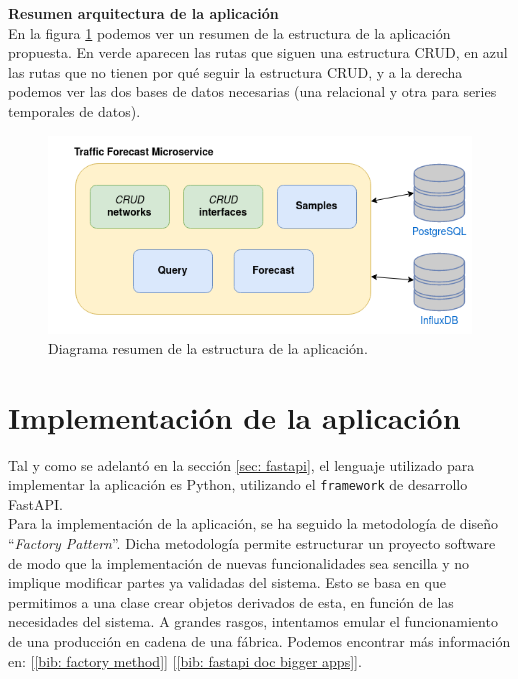 \documentclass[a4paper, oneside, 12pt]{book}
\begin{document}
	\noindent \textbf{\large Resumen arquitectura de la aplicación} \\
	
	\noindent En la figura \ref{img: app schema} podemos ver un resumen de la estructura de la aplicación propuesta. En verde aparecen las rutas que siguen una estructura CRUD, en azul las rutas que no tienen por qué seguir la estructura CRUD, y a la derecha podemos ver las dos bases de datos necesarias (una relacional y otra para series temporales de datos).
	
	\begin{figure}[h!]
		\includegraphics[width=1.1\textwidth, center]{diag/traffic_forecast_schema.png}
		\caption{Diagrama resumen de la estructura de la aplicación.}
		\label{img: app schema}
	\end{figure}

	\pagebreak
	
	\section{Implementación de la aplicación}
	
	\noindent Tal y como se adelantó en la sección \ref{sec: fastapi}, el lenguaje utilizado para implementar la aplicación es Python, utilizando el \texttt{framework} de desarrollo FastAPI. \\
	
	\noindent Para la implementación de la aplicación, se ha seguido la metodología de diseño ``\textit{Factory Pattern}''. Dicha metodología permite estructurar un proyecto software de modo que la implementación de nuevas funcionalidades sea sencilla y no implique modificar partes ya validadas del sistema. Esto se basa en que permitimos a una clase crear objetos derivados de esta, en función de las necesidades del sistema. A grandes rasgos, intentamos emular el funcionamiento de una producción en cadena de una fábrica. Podemos encontrar más información en: [\ref{bib: factory method}] [\ref{bib: fastapi doc bigger apps}]. \\
	
\end{document}
